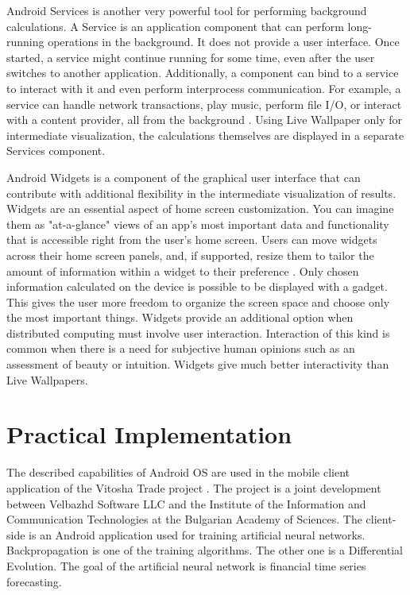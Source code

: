 \documentclass[a4paper,conference]{IEEEtran}
\begin{document}
Android Services is another very powerful tool for performing background calculations. A Service is an application component that can perform long-running operations in the background. It does not provide a user interface. Once started, a service might continue running for some time, even after the user switches to another application. Additionally, a component can bind to a service to interact with it and even perform interprocess communication. For example, a service can handle network transactions, play music, perform file I/O, or interact with a content provider, all from the background \cite{Google-01}. Using Live Wallpaper only for intermediate visualization, the calculations themselves are displayed in a separate Services component. 

Android Widgets is a component of the graphical user interface that can contribute with additional flexibility in the intermediate visualization of results. Widgets are an essential aspect of home screen customization. You can imagine them as "at-a-glance" views of an app's most important data and functionality that is accessible right from the user's home screen. Users can move widgets across their home screen panels, and, if supported, resize them to tailor the amount of information within a widget to their preference \cite{Google-02}. Only chosen information calculated on the device is possible to be displayed with a gadget. This gives the user more freedom to organize the screen space and choose only the most important things. Widgets provide an additional option when distributed computing must involve user interaction. Interaction of this kind is common when there is a need for subjective human opinions such as an assessment of beauty or intuition. Widgets give much better interactivity than Live Wallpapers. 

\section{Practical Implementation}

The described capabilities of Android OS are used in the mobile client application of the Vitosha Trade project \cite{Balabanov-01}. The project is a joint development between Velbazhd Software LLC and the Institute of the Information and Communication Technologies at the Bulgarian Academy of Sciences. The client-side is an Android application used for training artificial neural networks. Backpropagation is one of the training algorithms. The other one is a Differential Evolution. The goal of the artificial neural network is financial time series forecasting. 
\end{document}
